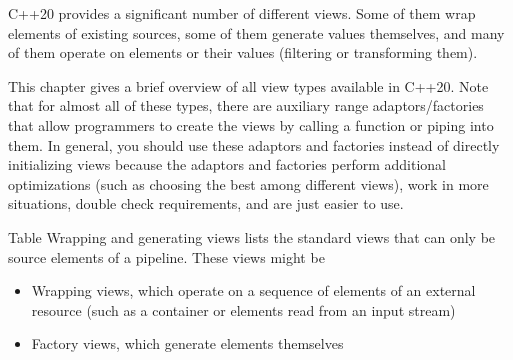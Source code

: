 
C++20 provides a significant number of different views. Some of them wrap elements of existing sources, some of them generate values themselves, and many of them operate on elements or their values (filtering or transforming them).

This chapter gives a brief overview of all view types available in C++20. Note that for almost all of these types, there are auxiliary range adaptors/factories that allow programmers to create the views by calling a function or piping into them. In general, you should use these adaptors and factories instead of directly initializing views because the adaptors and factories perform additional optimizations (such as choosing the best among different views), work in more situations, double check requirements, and are just easier to use.


Table Wrapping and generating views lists the standard views that can only be source elements of a pipeline.
These views might be

\begin{itemize}
\item
Wrapping views, which operate on a sequence of elements of an external resource (such as a container or elements read from an input stream)

\item
Factory views, which generate elements themselves
\end{itemize}


